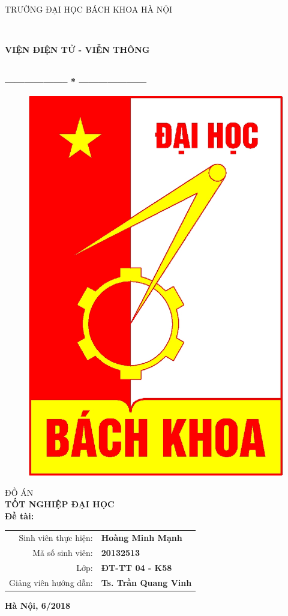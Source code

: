 \thispagestyle{empty}
\thisfancypage{
\setlength{\fboxsep}{0pt}
\fbox}{} 
\begin{center}
\begin{large}
TRƯỜNG ĐẠI HỌC BÁCH KHOA HÀ NỘI
\end{large}\\ \vspace{0.2cm}
\begin{large}
\textbf{VIỆN ĐIỆN TỬ - VIỄN THÔNG}
\end{large} \\
\textbf{--------------------  *  ---------------------}\\[0.5cm]
\begin{figure}[h!]
		\centering
		\includegraphics[width=0.18\linewidth]{image/logobk}
\end{figure}
 \vspace{1cm}

{\fontsize{18pt}{1} \textsc{ĐỒ ÁN}}\\ %
\vspace{0.5cm}
{\fontsize{24pt}{1} \textbf{TỐT NGHIỆP ĐẠI HỌC}}\\[2cm] %
\flushleft \hspace{0.1cm} \fontsize{12pt}{1} \textbf{Đề tài:\\}
\vspace{0.3cm}
\end{center}
\vspace{2cm}
\begin{table}[!htp]
    \centering
    \renewcommand{\arraystretch}{1.2}
    \begin{tabular}{ r l}    
    
    	 Sinh viên thực hiện: & \textbf{Hoàng Minh Mạnh} \\
    	 Mã số sinh viên: & \textbf{20132513} \\
    	 Lớp: & \textbf{ĐT-TT 04 - K58} \\
    	 Giảng viên hướng dẫn: & \textbf{Ts. Trần Quang Vinh} \\
    \end{tabular}
\end{table}


\vspace{2cm}
\begin{center}
{\fontsize{12pt}{1}\textbf{Hà Nội, 6/2018}}\\
\end{center}


